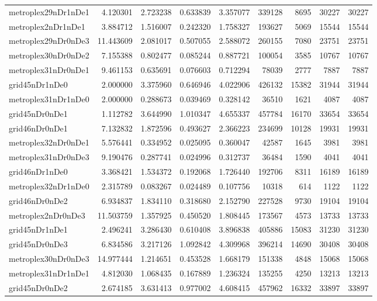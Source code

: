 \documentclass[../../../thesis.tex]{subfiles}
\begin{document}
\begin{longtable}{|l|r|r|r|r|r|r|r|r|}
metroplex29nDr1nDe1 & 4.120301 & 2.723238 & 0.633839 & 3.357077 & 339128 & 8695 & 30227 & 30227 \\
metroplex2nDr1nDe1 & 3.884712 & 1.516007 & 0.242320 & 1.758327 & 193627 & 5069 & 15544 & 15544 \\
metroplex29nDr0nDe3 & 11.443609 & 2.081017 & 0.507055 & 2.588072 & 260155 & 7080 & 23751 & 23751 \\
metroplex30nDr0nDe2 & 7.155388 & 0.802477 & 0.085244 & 0.887721 & 100054 & 3585 & 10767 & 10767 \\
metroplex31nDr0nDe1 & 9.461153 & 0.635691 & 0.076603 & 0.712294 & 78039 & 2777 & 7887 & 7887 \\
grid45nDr1nDe0 & 2.000000 & 3.375960 & 0.646946 & 4.022906 & 426132 & 15382 & 31944 & 31944 \\
metroplex31nDr1nDe0 & 2.000000 & 0.288673 & 0.039469 & 0.328142 & 36510 & 1621 & 4087 & 4087 \\
grid45nDr0nDe1 & 1.112782 & 3.644990 & 1.010347 & 4.655337 & 457784 & 16170 & 33654 & 33654 \\
grid46nDr0nDe1 & 7.132832 & 1.872596 & 0.493627 & 2.366223 & 234699 & 10128 & 19931 & 19931 \\
metroplex32nDr0nDe1 & 5.576441 & 0.334952 & 0.025095 & 0.360047 & 42587 & 1645 & 3981 & 3981 \\
metroplex31nDr0nDe3 & 9.190476 & 0.287741 & 0.024996 & 0.312737 & 36484 & 1590 & 4041 & 4041 \\
grid46nDr1nDe0 & 3.368421 & 1.534372 & 0.192068 & 1.726440 & 192706 & 8311 & 16189 & 16189 \\
metroplex32nDr1nDe0 & 2.315789 & 0.083267 & 0.024489 & 0.107756 & 10318 & 614 & 1122 & 1122 \\
grid46nDr0nDe2 & 6.934837 & 1.834110 & 0.318680 & 2.152790 & 227528 & 9730 & 19104 & 19104 \\
metroplex2nDr0nDe3 & 11.503759 & 1.357925 & 0.450520 & 1.808445 & 173567 & 4573 & 13733 & 13733 \\
grid45nDr1nDe1 & 2.496241 & 3.286430 & 0.610408 & 3.896838 & 405886 & 15083 & 31230 & 31230 \\
grid45nDr0nDe3 & 6.834586 & 3.217126 & 1.092842 & 4.309968 & 396214 & 14690 & 30408 & 30408 \\
metroplex30nDr0nDe3 & 14.977444 & 1.214651 & 0.453528 & 1.668179 & 151338 & 4848 & 15068 & 15068 \\
metroplex31nDr1nDe1 & 4.812030 & 1.068435 & 0.167889 & 1.236324 & 135255 & 4250 & 13213 & 13213 \\
grid45nDr0nDe2 & 2.674185 & 3.631413 & 0.977002 & 4.608415 & 457962 & 16332 & 33897 & 33897 \\

\end{longtable}
\end{document}
